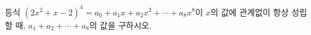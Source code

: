 등식 $(2x^2+x-2)^4=a_0+a_1x+a_2x^2+\cdots+a_8x^8$이 $x$의 값에 관계없이 항상 성립할 때, $a_1+a_2+\cdots+a_8$의 값을 구하시오. 
